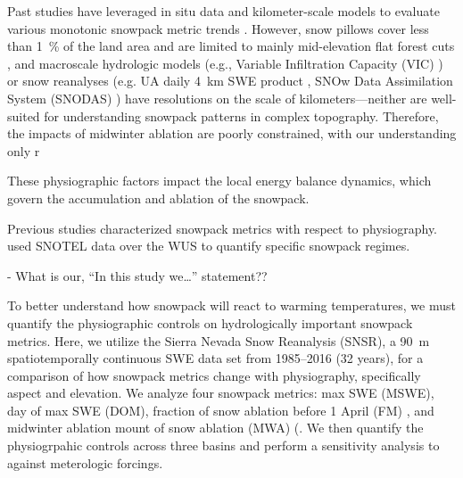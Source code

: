 
Past studies have leveraged in situ data \citep{clowChangesTimingSnowmelt2010,harpoldChangesSnowpackAccumulation2012a,kapnickCausesRecentChanges2012,musselmanWinterMeltTrends2021} and kilometer-scale models to evaluate various monotonic snowpack metric trends 
\citep{moteDECLININGMOUNTAINSNOWPACK2005, moteDramaticDeclinesSnowpack2018, zengSnowpackChange19822018, haleDriversSpatiotemporalPatterns2023}. However, snow pillows cover less than 1~\% of the land area and are limited to mainly mid-elevation flat forest cuts \citep{guan20102011Snow2013}, and macroscale hydrologic models (e.g., Variable Infiltration Capacity (VIC) \citep{liangSimpleHydrologicallyBased1994}) or snow reanalyses (e.g. UA daily 4~km SWE product \citep{broxtonLinkingSnowfallSnow2016}, SNOw Data Assimilation System (SNODAS) \citep{barrettNationalOperationalHydrologic2003}) have resolutions on the scale of kilometers---neither are well-suited for understanding snowpack patterns in complex topography. Therefore, the impacts of midwinter ablation are poorly constrained, with our understanding only r





These physiographic factors impact the local energy balance dynamics, which govern the accumulation and ablation of the snowpack. 



Previous studies characterized snowpack metrics with respect to physiography. \cite{trujilloSnowpackRegimesWestern2014} used SNOTEL data over the WUS to quantify specific snowpack regimes. \citep{tennantRegionalSensitivitiesSeasonal2017, molotchEcohydrologicalControlsSnowmelt2009} 

 - What is our, “In this study we…” statement?? \

To better understand how snowpack will react to warming temperatures, we must quantify the physiographic controls on hydrologically important snowpack metrics. Here, we utilize the Sierra Nevada Snow Reanalysis (SNSR), a 90~m spatiotemporally continuous SWE data set from 1985–2016 (32 years), for a comparison of how snowpack metrics change with physiography, specifically aspect and elevation. We analyze four snowpack metrics: max SWE (MSWE), day of max SWE (DOM), fraction of snow ablation before 1 April (FM) \citep{musselmanWinterMeltTrends2021}, and midwinter ablation mount of snow ablation (MWA) (\citep{harpoldHumidityDeterminesSnowpack2018}. We then quantify the physiogrpahic controls across three basins and perform a sensitivity analysis to against meterologic forcings. 

